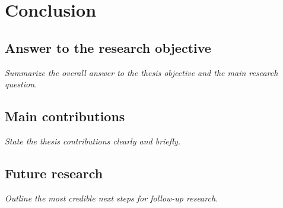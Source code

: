 \chapter{Conclusion}
\label{ch:conclusion}

\section{Answer to the research objective}
\textit{Summarize the overall answer to the thesis objective and the main research question.}

\section{Main contributions}
\textit{State the thesis contributions clearly and briefly.}

\section{Future research}
\textit{Outline the most credible next steps for follow-up research.}

